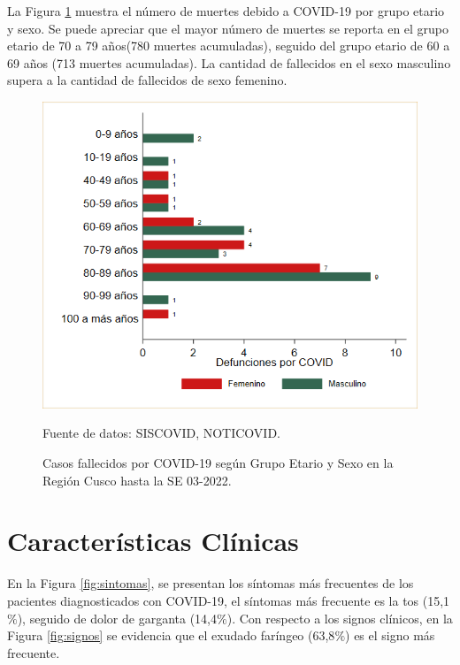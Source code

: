 \documentclass[12pt,a4paper,openany]{book}
\begin{document}
La Figura  \ref{fig:fallecidos_edad_sexo}  muestra el número de muertes debido a COVID-19 por grupo etario y sexo. Se puede apreciar que el mayor número de muertes se reporta en el grupo etario de 70 a 79 años(780 muertes acumuladas), seguido del grupo etario de 60 a 69 años (713 muertes acumuladas). La cantidad de fallecidos en el sexo masculino supera a la cantidad de fallecidos de sexo femenino.
\begin{figure}[h]
	\caption{Casos fallecidos por COVID-19 según Grupo Etario y Sexo en la Región Cusco hasta la SE 03-2022.}\label{fig:fallecidos_edad_sexo}
	\begin{center}
		\includegraphics[width=0.75\linewidth]{../figuras/defunciones_etapavida_2022}
	\end{center}
	{\footnotesize {Fuente de datos: SISCOVID, NOTICOVID.}}
\end{figure}



\cleardoublepage


\clearpage

\section*{Características Clínicas}


\noindent En la Figura \ref{fig:sintomas}, se presentan los síntomas más frecuentes de los pacientes diagnosticados con COVID-19, el síntomas más frecuente es la tos (15,1$\%$), seguido de dolor de garganta (14,4$\%$). Con respecto a los signos clínicos, en la Figura \ref{fig:signos} se evidencia que el exudado faríngeo (63,8$\%$) es el signo más frecuente. 
\end{document}

